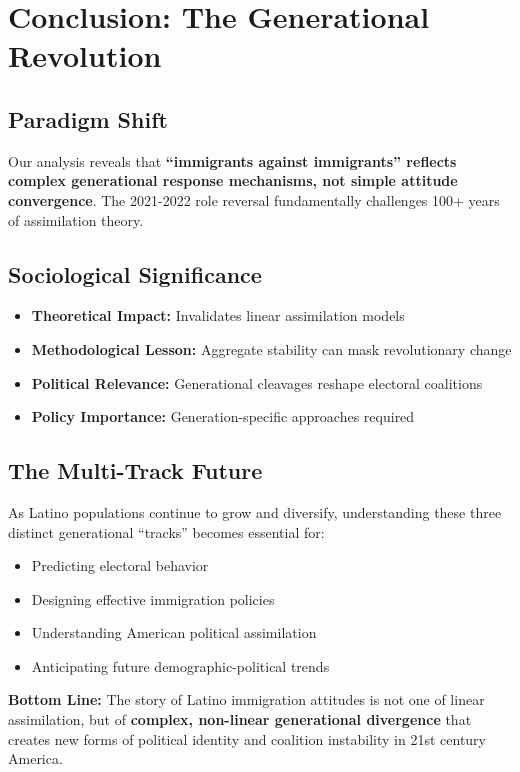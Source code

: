 \documentclass[11pt,letterpaper]{article}
\newcommand{\keyfinding}[1]{\colorbox{yellow!20}{\textbf{#1}}}
\begin{document}
\section{Conclusion: The Generational Revolution}

\subsection{Paradigm Shift}
Our analysis reveals that \keyfinding{``immigrants against immigrants'' reflects complex generational response mechanisms, not simple attitude convergence}. The 2021-2022 role reversal fundamentally challenges 100+ years of assimilation theory.

\subsection{Sociological Significance}
\begin{itemize}
    \item \textbf{Theoretical Impact:} Invalidates linear assimilation models
    \item \textbf{Methodological Lesson:} Aggregate stability can mask revolutionary change
    \item \textbf{Political Relevance:} Generational cleavages reshape electoral coalitions
    \item \textbf{Policy Importance:} Generation-specific approaches required
\end{itemize}

\subsection{The Multi-Track Future}
As Latino populations continue to grow and diversify, understanding these three distinct generational ``tracks'' becomes essential for:
\begin{itemize}
    \item Predicting electoral behavior
    \item Designing effective immigration policies  
    \item Understanding American political assimilation
    \item Anticipating future demographic-political trends
\end{itemize}

\textbf{Bottom Line:} The story of Latino immigration attitudes is not one of linear assimilation, but of \textbf{complex, non-linear generational divergence} that creates new forms of political identity and coalition instability in 21st century America.
\end{document}
